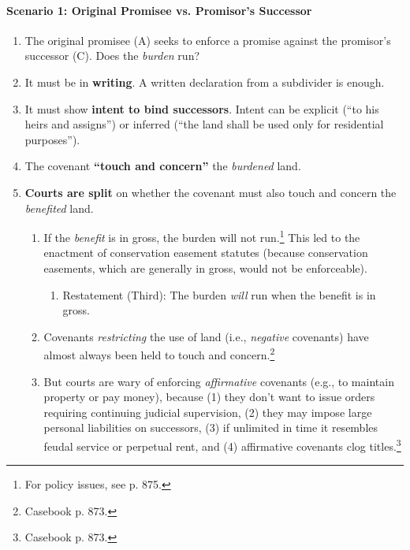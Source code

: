 \paragraph{Scenario 1: Original Promisee vs. Promisor's Successor}

\begin{enumerate}
    \item The original promisee (A) seeks to enforce a promise against the 
    promisor's  successor (C). Does the \emph{burden} run?
    \item It must be in \textbf{writing}. A written declaration from a 
    subdivider is enough.
    \item It must show \textbf{intent to bind successors}. Intent can be 
    explicit (``to his heirs and assigns'') or inferred (``the land shall be 
    used only for residential purposes'').
    \item The covenant \textbf{``touch and concern''} the \emph{burdened} land.
    \item \textbf{Courts are split} on whether the covenant must also touch 
    and concern the \emph{benefited} land.
    \begin{enumerate}
        \item If the \emph{benefit} is in gross, the burden will not 
        run.\footnote{For policy issues, see p. 875.} %
        This led to the enactment of conservation easement statutes (because 
        conservation easements, which are generally in gross, would not be 
        enforceable).
        \begin{enumerate}
            \item Restatement (Third): The burden \emph{will} run when the 
            benefit is in gross.
        \end{enumerate}
        \item Covenants \emph{restricting} the use of land (i.e., 
        \emph{negative} covenants) have almost always been held to touch and 
        concern.\footnote{Casebook p. 873.}
        \item But courts are wary of enforcing \emph{affirmative} covenants 
        (e.g., to maintain property or pay money), because (1) they don't want 
        to issue orders requiring continuing judicial supervision, (2) they 
        may impose large personal liabilities on successors, (3) if unlimited 
        in time it resembles feudal service or perpetual rent, and (4) 
        affirmative covenants clog titles.\footnote{Casebook p. 873.}

\end{enumerate}
\end{enumerate}
